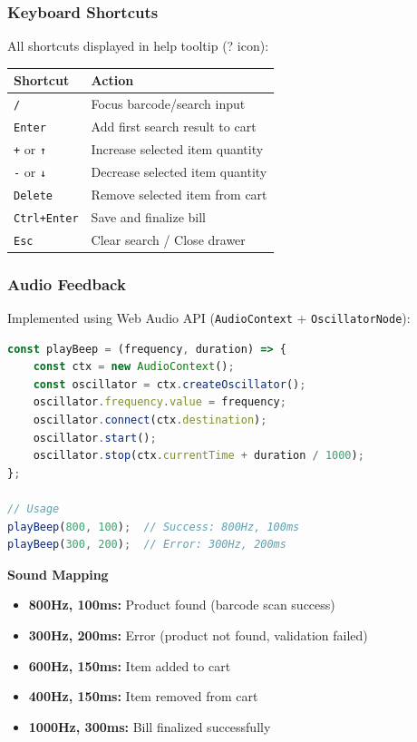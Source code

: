 \subsubsection{Keyboard Shortcuts}

All shortcuts displayed in help tooltip (? icon):

\begin{center}
\begin{tabular}{@{}ll@{}}
\toprule
\textbf{Shortcut} & \textbf{Action} \\
\midrule
\texttt{/} & Focus barcode/search input \\
\texttt{Enter} & Add first search result to cart \\
\texttt{+} or \texttt{↑} & Increase selected item quantity \\
\texttt{-} or \texttt{↓} & Decrease selected item quantity \\
\texttt{Delete} & Remove selected item from cart \\
\texttt{Ctrl+Enter} & Save and finalize bill \\
\texttt{Esc} & Clear search / Close drawer \\
\bottomrule
\end{tabular}
\end{center}

\subsubsection{Audio Feedback}

Implemented using Web Audio API (\texttt{AudioContext} + \texttt{OscillatorNode}):

\begin{lstlisting}[language=JavaScript,label=lst:audio-feedback]
const playBeep = (frequency, duration) => {
    const ctx = new AudioContext();
    const oscillator = ctx.createOscillator();
    oscillator.frequency.value = frequency;
    oscillator.connect(ctx.destination);
    oscillator.start();
    oscillator.stop(ctx.currentTime + duration / 1000);
};

// Usage
playBeep(800, 100);  // Success: 800Hz, 100ms
playBeep(300, 200);  // Error: 300Hz, 200ms
\end{lstlisting}

\textbf{Sound Mapping}

\begin{itemize}
    \item \textbf{800Hz, 100ms:} Product found (barcode scan success)
    \item \textbf{300Hz, 200ms:} Error (product not found, validation failed)
    \item \textbf{600Hz, 150ms:} Item added to cart
    \item \textbf{400Hz, 150ms:} Item removed from cart
    \item \textbf{1000Hz, 300ms:} Bill finalized successfully
\end{itemize}

